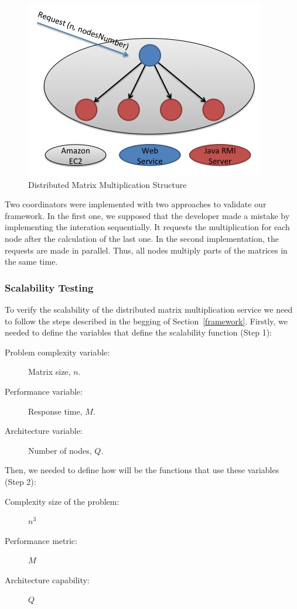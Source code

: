 \begin{figure}[htbp]
\begin{center}
	\includegraphics[scale=0.6]{images/dmm}
\caption{Distributed Matrix Multiplication Structure}
\label{dmm}
\end{center}
\end{figure}

Two coordinators were implemented with two approaches to validate our framework. In the first one, we supposed that the developer made a mistake by implementing the interation sequentially. It requests the multiplication for each node after the calculation of the last one. In the second implementation, the requests are made in parallel. Thus, all nodes multiply parts of the matrices in the same time.

\subsubsection{Scalability Testing}
To verify the scalability of the distributed matrix multiplication service we need to follow the steps described in the begging of Section~\ref{framework}. Firstly, we needed to define the variables that define the scalability function (Step 1):
\begin{description}
\item[Problem complexity variable: ] Matrix size, $n$.
\item[Performance variable: ]  Response time, $M$.
\item[Architecture variable: ] Number of nodes, $Q$.
\end{description}

Then, we needed to define how will be the functions that use these variables (Step 2):
\begin{description}
\item[Complexity size of the problem: ] $n^3$
\item[Performance metric: ]  $M$ 
\item[Architecture capability: ] $Q$
\end{description}

